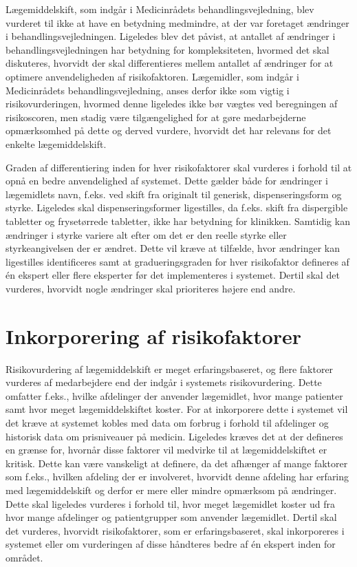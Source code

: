 Lægemiddelskift, som indgår i Medicinrådets behandlingsvejledning, blev vurderet til ikke at have en betydning medmindre, at der var foretaget ændringer i behandlingsvejledningen. Ligeledes blev det påvist, at antallet af ændringer i behandlingsvejledningen har betydning for kompleksiteten, hvormed det skal diskuteres, hvorvidt der skal differentieres mellem antallet af ændringer for at optimere anvendeligheden af risikofaktoren. Lægemidler, som indgår i Medicinrådets behandlingsvejledning, anses derfor ikke som vigtig i risikovurderingen, hvormed denne ligeledes ikke bør vægtes ved beregningen af risikoscoren, men stadig være tilgængelighed for at gøre medarbejderne opmærksomhed på dette og derved vurdere, hvorvidt det har relevans for det enkelte lægemiddelskift.

Graden af differentiering inden for hver risikofaktorer skal vurderes i forhold til at opnå en bedre anvendelighed af systemet. Dette gælder både for ændringer i lægemidlets navn, f.eks. ved skift fra originalt til generisk, dispenseringsform og styrke. Ligeledes skal dispenseringsformer ligestilles, da f.eks. skift fra dispergible tabletter og frysetørrede tabletter, ikke har betydning for klinikken. Samtidig kan ændringer i styrke variere alt efter om det er den reelle styrke eller styrkeangivelsen der er ændret. Dette vil kræve at tilfælde, hvor ændringer kan ligestilles identificeres samt at gradueringsgraden for hver risikofaktor defineres af én ekspert eller flere eksperter før det implementeres i systemet. Dertil skal det vurderes, hvorvidt nogle ændringer skal prioriteres højere end andre. 

\section{Inkorporering af risikofaktorer}
Risikovurdering af lægemiddelskift er meget erfaringsbaseret, og flere faktorer vurderes af medarbejdere end der indgår i systemets risikovurdering. Dette omfatter f.eks., hvilke afdelinger der anvender lægemidlet, hvor mange patienter samt hvor meget lægemiddelskiftet koster. For at inkorporere dette i systemet vil det kræve at systemet kobles med data om forbrug i forhold til afdelinger og historisk data om prisniveauer på medicin. Ligeledes kræves det at der defineres en grænse for, hvornår disse faktorer vil medvirke til at lægemiddelskiftet er kritisk. Dette kan være vanskeligt at definere, da det afhænger af mange faktorer som f.eks., hvilken afdeling der er involveret, hvorvidt denne afdeling har erfaring med lægemiddelskift og derfor er mere eller mindre opmærksom på ændringer. Dette skal ligeledes vurderes i forhold til, hvor meget lægemidlet koster ud fra hvor mange afdelinger og patientgrupper som anvender lægemidlet. Dertil skal det vurderes, hvorvidt risikofaktorer, som er erfaringsbaseret, skal inkorporeres i systemet eller om vurderingen af disse håndteres bedre af én ekspert inden for området.


